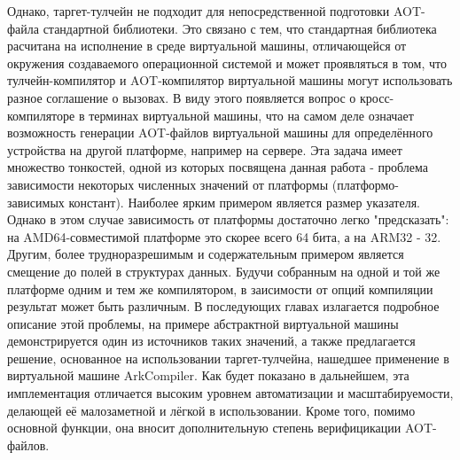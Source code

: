 \par
Однако, таргет-тулчейн не подходит для непосредственной подготовки AOT-файла стандартной библиотеки.
Это связано с тем, что стандартная библиотека расчитана на исполнение в среде виртуальной машины, отличающейся от окружения создаваемого операционной системой и может проявляться в том, что тулчейн-компилятор и AOT-компилятор виртуальной машины могут использовать разное соглашение о вызовах.
В виду этого появляется вопрос о кросс-компиляторе в терминах виртуальной машины, что на самом деле означает возможность генерации AOT-файлов виртуальной машины для определённого устройства на другой платформе, например на сервере. Эта задача имеет множество тонкостей, одной из которых посвящена данная работа - проблема зависимости некоторых численных значений от платформы (платформо-зависимых констант). Наиболее ярким примером является размер указателя. Однако в этом случае зависимость от платформы достаточно легко "предсказать": на AMD64-совместимой платформе это скорее всего 64 бита, а на ARM32 - 32. Другим, более трудноразрешимым и содержательным примером является смещение до полей в структурах данных. Будучи собранным на одной и той же платформе одним и тем же компилятором, в заисимости от опций компиляции результат может быть различным. В последующих главах излагается подробное описание этой проблемы, на примере абстрактной виртуальной машины демонстрируется один из источников таких значений, а также предлагается решение, основанное на использовании таргет-тулчейна, нашедшее применение в виртуальной машине ArkCompiler. Как будет показано в дальнейшем, эта имплементация отличается высоким уровнем автоматизации и масштабируемости, делающей её малозаметной и лёгкой в использовании. Кроме того, помимо основной функции, она вносит дополнительную степень верифицикации AOT-файлов.

\newpage